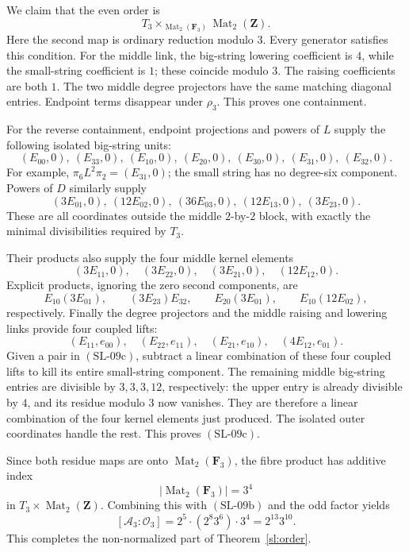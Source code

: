\documentclass[11pt,a4paper]{article}
\theoremstyle{remark}
\begin{document}
We claim that the even order is
\[
T_3\times_{\operatorname{Mat}_2(\mathbf F_3)}
                 \operatorname{Mat}_2(\mathbf Z).
\tag{SL-09c}
\]
Here the second map is ordinary reduction modulo \(3\).
Every generator satisfies this condition.  For the middle
link, the big-string lowering coefficient is \(4\), while
the small-string coefficient is \(1\); these coincide
modulo \(3\).  The raising coefficients are both \(1\).
The two middle degree projectors have the same matching
diagonal entries.  Endpoint terms disappear under \(\rho_3\).
This proves one containment.

For the reverse containment, endpoint projections and powers
of \(L\) supply the following isolated big-string units:
\[
(E_{00},0),\ (E_{33},0),\
(E_{10},0),\ (E_{20},0),\ (E_{30},0),\
(E_{31},0),\ (E_{32},0).
\]
For example,
\(\pi_6L^2\pi_2=(E_{31},0)\); the small string has no
degree-six component.  Powers of \(D\) similarly supply
\[
(3E_{01},0),\ (12E_{02},0),\ (36E_{03},0),\
(12E_{13},0),\ (3E_{23},0).
\]
These are all coordinates outside the middle \(2\)-by-\(2\)
block, with exactly the minimal divisibilities required
by \(T_3\).

Their products also supply the four middle kernel elements
\[
(3E_{11},0),\quad(3E_{22},0),\quad
(3E_{21},0),\quad(12E_{12},0).
\]
Explicit products, ignoring the zero second components, are
\[
E_{10}(3E_{01}),\qquad
(3E_{23})E_{32},\qquad
E_{20}(3E_{01}),\qquad
E_{10}(12E_{02}),
\]
respectively.  Finally the degree projectors and the middle
raising and lowering links provide four coupled lifts:
\[
(E_{11},e_{00}),\quad (E_{22},e_{11}),\quad
(E_{21},e_{10}),\quad (4E_{12},e_{01}).
\]
Given a pair in \((\mathrm{SL\text{-}09c})\), subtract a
linear combination of these four coupled lifts to kill its
entire small-string component.  The remaining middle
big-string entries are divisible by \(3,3,3,12\), respectively:
the upper entry is already divisible by \(4\), and its
residue modulo \(3\) now vanishes.  They are therefore a
linear combination of the four kernel elements just produced.
The isolated outer coordinates handle the rest.  This proves
\((\mathrm{SL\text{-}09c})\).

Since both residue maps are onto
\(\operatorname{Mat}_2(\mathbf F_3)\), the fibre product has
additive index
\[
\left|\operatorname{Mat}_2(\mathbf F_3)\right|=3^4
\]
in \(T_3\times\operatorname{Mat}_2(\mathbf Z)\).
Combining this with \((\mathrm{SL\text{-}09b})\) and the
odd factor yields
\[
[\mathcal A_3:\mathcal O_3]
=2^5\cdot(2^8 3^6)\cdot3^4
=2^{13}3^{10}.
\]
This completes the non-normalized part of
Theorem~\ref{sl:order}.
\end{document}
